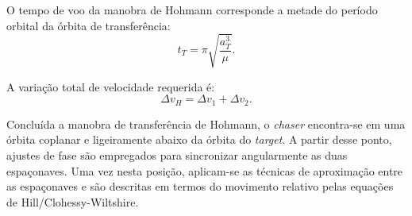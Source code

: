 O tempo de voo da manobra de Hohmann corresponde a metade do período orbital da órbita de transferência:
\begin{equation}
    t_T = \pi \sqrt{\frac{a_T^3}{\mu}}.
\end{equation}

A variação total de velocidade requerida é:
\begin{equation}
    \Delta v_{H} = \Delta v_1 + \Delta v_2.
\end{equation}

Concluída a manobra de transferência de Hohmann, o \emph{chaser} encontra-se em uma órbita coplanar e ligeiramente abaixo da órbita do \emph{target}. 
A partir desse ponto, ajustes de fase são empregados para sincronizar angularmente as duas espaçonaves. 
Uma vez nesta posição, aplicam-se as técnicas de aproximação entre as espaçonaves e são descritas em termos do movimento relativo pelas equações de Hill/Clohessy-Wiltshire.

